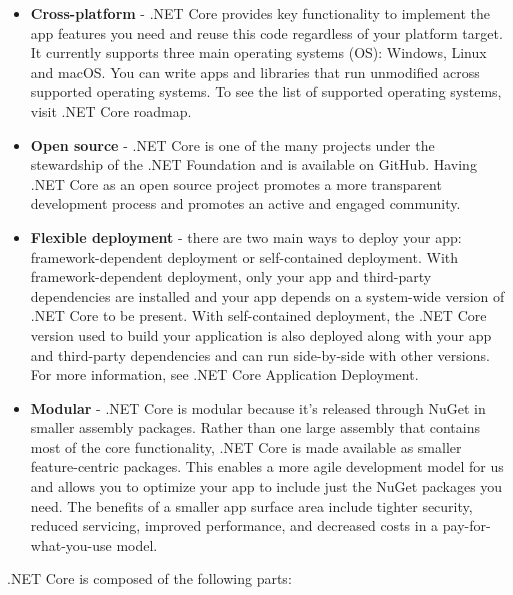 \documentclass[../thesis.tex]{subfiles}
\begin{document}
\begin{itemize}
  \item \textbf{Cross-platform} - .NET Core provides key functionality to implement the app features you need and reuse this code regardless of your platform target. It currently supports three main operating systems (OS): Windows, Linux and macOS. You can write apps and libraries that run unmodified across supported operating systems. To see the list of supported operating systems, visit .NET Core roadmap.
  \vspace{5mm}
  \item \textbf{Open source} - .NET Core is one of the many projects under the stewardship of the .NET Foundation and is available on GitHub. Having .NET Core as an open source project promotes a more transparent development process and promotes an active and engaged community.
  \vspace{5mm}
  \item \textbf{Flexible deployment} - there are two main ways to deploy your app: framework-dependent deployment or self-contained deployment. With framework-dependent deployment, only your app and third-party dependencies are installed and your app depends on a system-wide version of .NET Core to be present. With self-contained deployment, the .NET Core version used to build your application is also deployed along with your app and third-party dependencies and can run side-by-side with other versions. For more information, see .NET Core Application Deployment.
  \vspace{5mm}
  \item \textbf{Modular} - .NET Core is modular because it's released through NuGet in smaller assembly packages. Rather than one large assembly that contains most of the core functionality, .NET Core is made available as smaller feature-centric packages. This enables a more agile development model for us and allows you to optimize your app to include just the NuGet packages you need. The benefits of a smaller app surface area include tighter security, reduced servicing, improved performance, and decreased costs in a pay-for-what-you-use model.
\end{itemize}
\vspace{5mm}
.NET Core is composed of the following parts:
\end{document}
